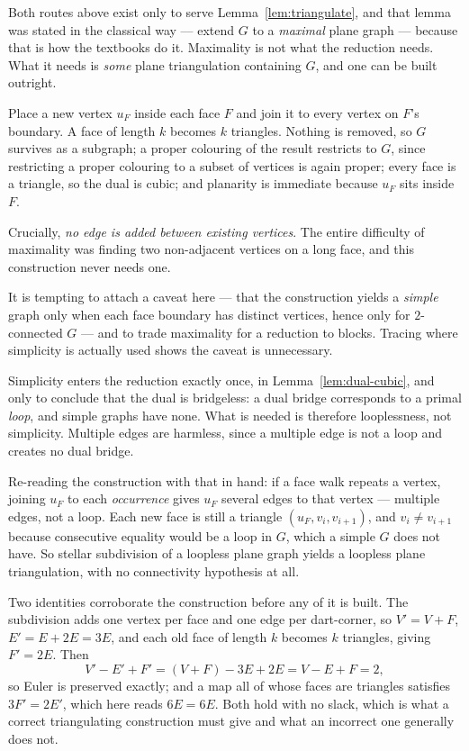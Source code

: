 \begin{remark}\label{rem:stellar}
\Sprose
Both routes above exist only to serve Lemma~\ref{lem:triangulate}, and that
lemma was stated in the classical way --- extend $G$ to a \emph{maximal}
plane graph --- because that is how the textbooks do it. Maximality is not
what the reduction needs. What it needs is \emph{some} plane triangulation
containing $G$, and one can be built outright.

Place a new vertex $u_F$ inside each face $F$ and join it to every vertex on
$F$'s boundary. A face of length $k$ becomes $k$ triangles. Nothing is
removed, so $G$ survives as a subgraph; a proper colouring of the result
restricts to $G$, since restricting a proper colouring to a subset of
vertices is again proper; every face is a triangle, so the dual is cubic;
and planarity is immediate because $u_F$ sits inside $F$.

Crucially, \emph{no edge is added between existing vertices}. The entire
difficulty of maximality was finding two non-adjacent vertices on a long
face, and this construction never needs one.

It is tempting to attach a caveat here --- that the construction yields a
\emph{simple} graph only when each face boundary has distinct vertices,
hence only for $2$-connected $G$ --- and to trade maximality for a reduction
to blocks. Tracing where simplicity is actually used shows the caveat is
unnecessary.

Simplicity enters the reduction exactly once, in Lemma~\ref{lem:dual-cubic},
and only to conclude that the dual is bridgeless: a dual bridge corresponds
to a primal \emph{loop}, and simple graphs have none. What is needed is
therefore looplessness, not simplicity. Multiple edges are harmless, since a
multiple edge is not a loop and creates no dual bridge.

Re-reading the construction with that in hand: if a face walk repeats a
vertex, joining $u_F$ to each \emph{occurrence} gives $u_F$ several edges to
that vertex --- multiple edges, not a loop. Each new face is still a triangle
$(u_F, v_i, v_{i+1})$, and $v_i \ne v_{i+1}$ because consecutive equality
would be a loop in $G$, which a simple $G$ does not have. So stellar
subdivision of a loopless plane graph yields a loopless plane triangulation,
with no connectivity hypothesis at all.

Two identities corroborate the construction before any of it is built. The
subdivision adds one vertex per face and one edge per dart-corner, so
$V' = V + F$, $E' = E + 2E = 3E$, and each old face of length $k$ becomes $k$
triangles, giving $F' = 2E$. Then
\[
  V' - E' + F' = (V + F) - 3E + 2E = V - E + F = 2 ,
\]
so Euler is preserved exactly; and a map all of whose faces are triangles
satisfies $3F' = 2E'$, which here reads $6E = 6E$. Both hold with no slack,
which is what a correct triangulating construction must give and what an
incorrect one generally does not.


\end{remark}
